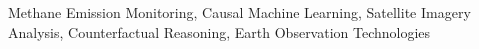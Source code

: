 \acresetall
\noindent Methane Emission Monitoring, Causal Machine Learning, Satellite Imagery Analysis, Counterfactual Reasoning, Earth Observation Technologies
